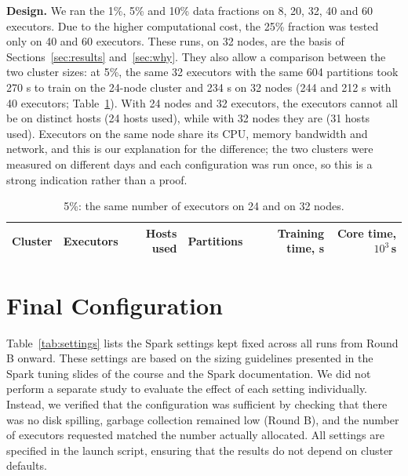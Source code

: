 \documentclass[a4paper, 11pt]{article} %
\begin{document}
\textbf{Design.} We ran the 1\%, 5\% and 10\% data fractions on 8, 20, 32, 40 and 60 executors. Due to the higher computational cost, the 25\% fraction was tested only on 40 and 60 executors. These runs, on 32 nodes, are the basis of Sections~\ref{sec:results} and~\ref{sec:why}. They also allow a comparison between the two cluster sizes: at 5\%, the same 32 executors with the same 604 partitions took 270 s to train on the 24-node cluster and 234 s on 32 nodes (244 and 212 s with 40 executors; Table~\ref{tab:nodes}). With 24 nodes and 32 executors, the executors cannot all be on distinct hosts (24 hosts used), while with 32 nodes they are (31 hosts used). Executors on the same node share its CPU, memory bandwidth and network, and this is our explanation for the difference; the two clusters were measured on different days and each configuration was run once, so this is a strong indication rather than a proof.

\begin{table}[H]
\centering
\footnotesize
\begin{tabular}{@{}lrrrrr@{}}
\hline
Cluster & Executors & Hosts used & Partitions & Training time, s & Core time, $10^3$\,s \\
\hline

\end{tabular}
\caption{5\%: the same number of executors on 24 and on 32 nodes.}
\label{tab:nodes}
\end{table}

\section{Final Configuration}
\label{sec:config}

Table~\ref{tab:settings} lists the Spark settings kept fixed across all runs from Round B onward. These settings are based on the sizing guidelines presented in the Spark tuning slides of the course and the Spark documentation. We did not perform a separate study to evaluate the effect of each setting individually. Instead, we verified that the configuration was sufficient by checking that there was no disk spilling, garbage collection remained low (Round B), and the number of executors requested matched the number actually allocated. All settings are specified in the launch script, ensuring that the results do not depend on cluster defaults.
\end{document}
